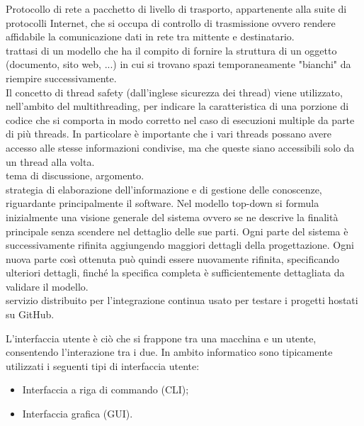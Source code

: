 \documentclass{scalatekids-article}
\begin{document}
   Protocollo di rete a pacchetto di livello di trasporto, appartenente alla suite di protocolli Internet, che si occupa di controllo di trasmissione ovvero rendere affidabile la comunicazione dati in rete tra mittente e destinatario. 
  \\

   trattasi di un modello che ha il compito di fornire la struttura di un oggetto (documento, sito web, ...) in cui si trovano spazi temporaneamente "bianchi" da riempire successivamente.
  \\

   Il concetto di thread safety (dall'inglese sicurezza dei thread) viene utilizzato, nell'ambito del multithreading, per indicare la caratteristica di una porzione di codice che si comporta in modo corretto nel caso di esecuzioni multiple da parte di più threads. In particolare è importante che i vari threads possano avere accesso alle stesse informazioni condivise, ma che queste siano accessibili solo da un thread alla volta.
  \\

   tema di discussione, argomento.
  \\

   strategia di elaborazione dell'informazione e di gestione delle conoscenze, riguardante principalmente il software.
  Nel modello top-down si formula inizialmente una visione generale del sistema ovvero se ne descrive la finalità principale senza scendere nel dettaglio delle sue parti. Ogni parte del sistema è successivamente rifinita aggiungendo maggiori dettagli della progettazione. Ogni nuova parte così ottenuta può quindi essere nuovamente rifinita, specificando ulteriori dettagli, finché la specifica completa è sufficientemente dettagliata da validare il modello.
  \\

   servizio distribuito per l'integrazione continua usato per testare i progetti hostati su GitHub.
  \\


   L'interfaccia utente è ciò che si frappone tra una macchina e un utente, consentendo l'interazione tra i due. In ambito informatico sono tipicamente utilizzati i seguenti tipi di interfaccia utente:

  \begin{itemize}
  \item Interfaccia a riga di commando (CLI);
  \item Interfaccia grafica (GUI).
  \end{itemize}
\end{document}
